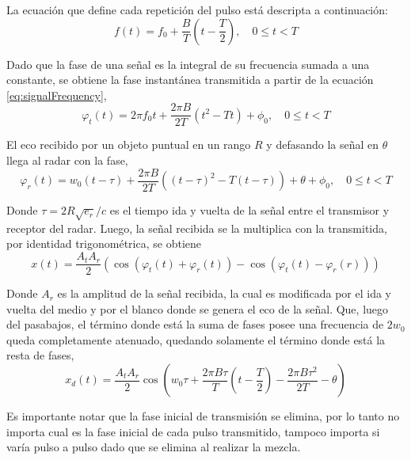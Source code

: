 La ecuación que define cada repetición del pulso está descripta a continuación:
\begin{equation}
	f(t) = f_0 + \dfrac{B}{T}(t-\dfrac{T}{2}),\quad 0 \le t < T
	\label{eq:signalFrequency}
\end{equation}

Dado que la fase de una señal es la integral de su frecuencia sumada a una constante, se obtiene la fase instantánea transmitida a partir de
la ecuación \ref{eq:signalFrequency},
\begin{equation}
	\varphi_t(t) = 2\pi f_0t + \dfrac{2\pi B}{2T}(t^2-Tt) + \phi_0,\quad 0 \le t < T
	\label{eq:signalFrequency}
\end{equation}

El eco recibido por un objeto puntual en un rango $R$ y defasando la señal en $\theta$ llega al radar con la fase, 
\begin{equation}
	\varphi_r(t) = w_0(t-\tau) + \dfrac{2\pi B}{2T}((t - \tau)^2-T(t - \tau)) + \theta + \phi_0,\quad 0 \le t < T
	\label{eq:signalFrequency}
\end{equation}

Donde $\tau=2R\sqrt{e_r}/c$ es el tiempo ida y vuelta de la señal entre el transmisor y receptor del radar.
Luego, la señal recibida se la multiplica con la transmitida, por identidad trigonométrica, se obtiene 
\begin{equation}
	x(t) = \dfrac{A_tA_r}{2}(\cos(\varphi_t(t)+\varphi_r(t)) - \cos(\varphi_t(t)- \varphi_r(r)))
	\label{eq:signalFrequency}
\end{equation}

Donde $A_r$ es la amplitud de la señal recibida, la cual es modificada por el ida y vuelta del medio y por el blanco donde se 
genera el eco de la señal.
Que, luego del pasabajos, el término donde está la suma de fases posee una frecuencia de $2w_0$ queda completamente atenuado, 
quedando solamente el término donde está la resta de fases,
\begin{equation}
	x_d(t) = \dfrac{A_tA_r}{2}\cos(w_0\tau + \dfrac{2\pi B\tau}{T}(t - \dfrac{T}{2}) - \dfrac{2\pi B\tau^2}{2T} - \theta)
	\label{eq:signalFrequency}
\end{equation}


Es importante notar que la fase inicial de transmisión se elimina, por lo tanto no importa cual es la fase inicial de cada pulso
transmitido, tampoco importa si varía pulso a pulso dado que se elimina al realizar la mezcla.

